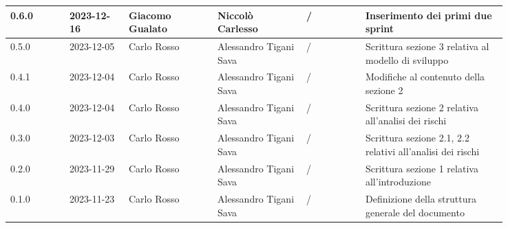 {\begin{longtable}{p{0.10\linewidth}p{0.10\linewidth}p{0.15\linewidth}p{0.15\linewidth}p{0.10\linewidth}p{0.24\linewidth}}
	0.6.0			  & 2023-12-16    & Giacomo Gualato     & Niccolò Carlesso	& /	& Inserimento dei primi due sprint				\\
	\hline
	0.5.0             & 2023-12-05    & Carlo Rosso        & Alessandro Tigani Sava	& /	& Scrittura sezione 3 relativa al modello di sviluppo	\\
	\hline
	0.4.1             & 2023-12-04    & Carlo Rosso        & Alessandro Tigani Sava	& /	& Modifiche al contenuto della sezione 2				\\
	\hline
	0.4.0             & 2023-12-04    & Carlo Rosso        & Alessandro Tigani Sava	& /	& Scrittura sezione 2 relativa all'analisi dei rischi	\\
	\hline
	0.3.0             & 2023-12-03    & Carlo Rosso        & Alessandro Tigani Sava	& /	& Scrittura sezione 2.1, 2.2 relativi all'analisi dei rischi	\\
	\hline
	0.2.0             & 2023-11-29    & Carlo Rosso        & Alessandro Tigani Sava	& /	& Scrittura sezione 1 relativa all'introduzione			\\
	\hline
	0.1.0             & 2023-11-23    & Carlo Rosso        & Alessandro Tigani Sava	& /	& Definizione della struttura generale del documento	\\
	\bottomrule
\end{longtable}
}